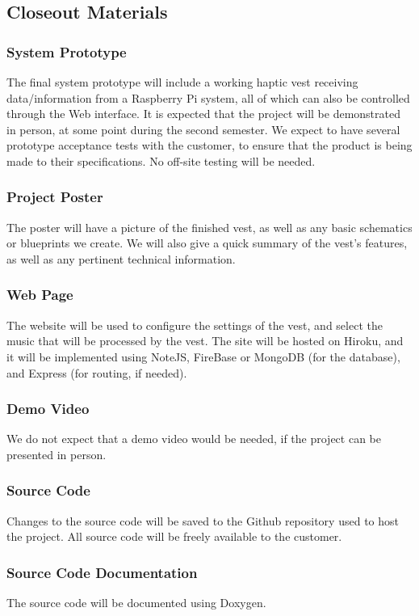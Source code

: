 \subsection{Closeout Materials}

\subsubsection{System Prototype}
The final system prototype will include a working haptic vest receiving data/information from a Raspberry Pi system, all of which can also be controlled through the Web interface. It is expected that the project will be demonstrated in person, at some point during the second semester. We expect to have several prototype acceptance tests with the customer, to ensure that the product is being made to their specifications. No off-site testing will be needed.

\subsubsection{Project Poster}
The poster will have a picture of the finished vest, as well as any basic schematics or blueprints we create. We will also give a quick summary of the vest's features, as well as any pertinent technical information.

\subsubsection{Web Page}
The website will be used to configure the settings of the vest, and select the music that will be processed by the vest. The site will be hosted on Hiroku, and it will be implemented using NoteJS, FireBase or MongoDB (for the database), and Express (for routing, if needed).

\subsubsection{Demo Video}
We do not expect that a demo video would be needed, if the project can be presented in person.

\subsubsection{Source Code}
Changes to the source code will be saved to the Github repository used to host the project. All source code will be freely available to the customer.

\subsubsection{Source Code Documentation}
The source code will be documented using Doxygen.


